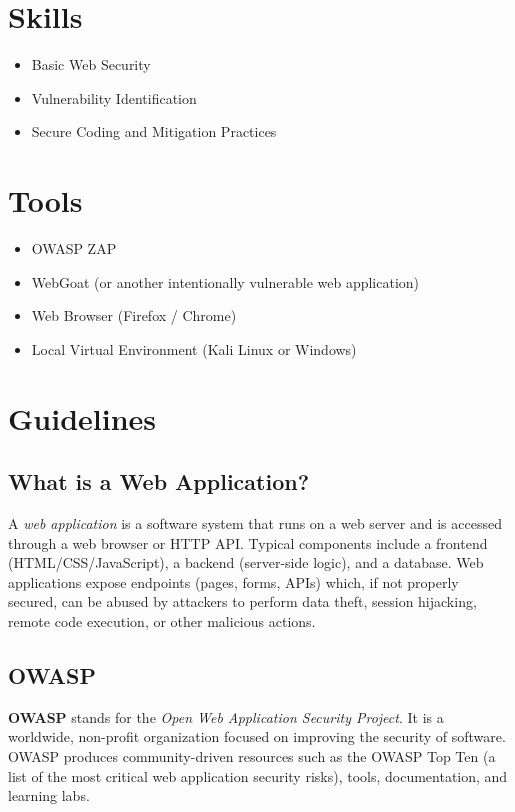 \documentclass[12pt,a4paper]{report}
\begin{document}
\section{Skills}
\begin{itemize}
  \item Basic Web Security
  \item Vulnerability Identification
  \item Secure Coding and Mitigation Practices
\end{itemize}

\section{Tools}
\begin{itemize}
  \item OWASP ZAP
  \item WebGoat (or another intentionally vulnerable web application)
  \item Web Browser (Firefox / Chrome)
  \item Local Virtual Environment (Kali Linux or Windows)
\end{itemize}

\section{Guidelines}



\subsection{What is a Web Application?}
A \emph{web application} is a software system that runs on a web server and is accessed through a web browser or HTTP API. Typical components include a frontend (HTML/CSS/JavaScript), a backend (server-side logic), and a database. Web applications expose endpoints (pages, forms, APIs) which, if not properly secured, can be abused by attackers to perform data theft, session hijacking, remote code execution, or other malicious actions.

\subsection{OWASP}
\textbf{OWASP} stands for the \emph{Open Web Application Security Project}. It is a worldwide, non-profit organization focused on improving the security of software. OWASP produces community-driven resources such as the OWASP Top Ten (a list of the most critical web application security risks), tools, documentation, and learning labs.
\end{document}
